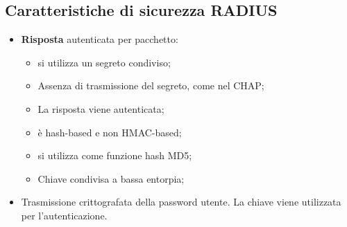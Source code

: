 \documentclass{article}
\theoremstyle{remark}
\begin{document}
\subsection{Caratteristiche di sicurezza RADIUS}
\begin{itemize}
    \item \textbf{Risposta} autenticata per pacchetto:\begin{itemize}
        \item si utilizza un segreto condiviso;
        \item Assenza di trasmissione del segreto, come nel CHAP;
        \item La risposta viene autenticata;
        \item è hash-based e non HMAC-based;
        \item si utilizza come funzione hash MD5;
        \item Chiave condivisa a bassa entorpia;
    \end{itemize}
    \item Trasmissione crittografata della password utente. La chiave viene utilizzata per l'autenticazione.
\end{itemize}
\end{document}
